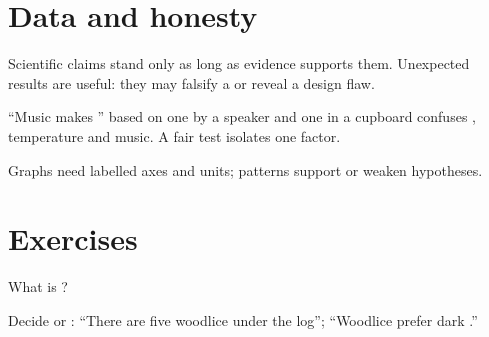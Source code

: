 \section{Data and honesty}

\begin{proposition}\label{prop:g6:method:evidence}
Scientific claims stand only as long as evidence supports them.
Unexpected results are useful: they may falsify a  or reveal
a design flaw.
\end{proposition}
\admitted

\begin{example}\label{ex:g6:method:weak}
``Music makes  '' based on one  by a speaker and one in
a cupboard confuses , temperature and music. A fair test isolates
one factor.
\end{example}

\begin{omfigure}

{\small Graphs need labelled axes and units; patterns support or weaken
hypotheses.}
\end{omfigure}

\section{Exercises}

\begin{exercise}[$\star$]\label{exo:g6:method:1}
What is ?
\end{exercise}

\begin{exercise}[$\star$]\label{exo:g6:method:2}
Decide  or : ``There are five woodlice under the
log''; ``Woodlice prefer dark .''
\end{exercise}

